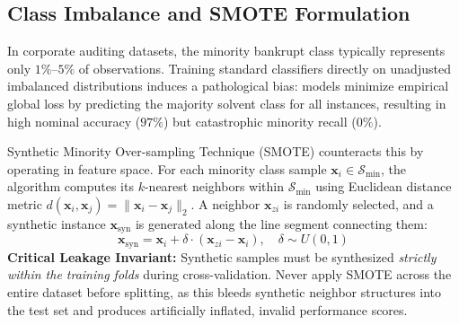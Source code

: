 \documentclass[11pt, a4paper]{article}
\begin{document}
\subsection{Class Imbalance and SMOTE Formulation}
In corporate auditing datasets, the minority bankrupt class typically represents only $1\%\text{--}5\%$ of observations. Training standard classifiers directly on unadjusted imbalanced distributions induces a pathological bias: models minimize empirical global loss by predicting the majority solvent class for all instances, resulting in high nominal accuracy ($97\%$) but catastrophic minority recall ($0\%$).

Synthetic Minority Over-sampling Technique (SMOTE) counteracts this by operating in feature space. For each minority class sample $\mathbf{x}_i \in \mathcal{S}_{\text{min}}$, the algorithm computes its $k$-nearest neighbors within $\mathcal{S}_{\text{min}}$ using Euclidean distance metric $d(\mathbf{x}_i, \mathbf{x}_j) = \|\mathbf{x}_i - \mathbf{x}_j\|_2$. A neighbor $\mathbf{x}_{zi}$ is randomly selected, and a synthetic instance $\mathbf{x}_{\text{syn}}$ is generated along the line segment connecting them:
\begin{equation}
    \mathbf{x}_{\text{syn}} = \mathbf{x}_i + \delta \cdot (\mathbf{x}_{zi} - \mathbf{x}_i), \quad \delta \sim U(0, 1)
\end{equation}
\textbf{Critical Leakage Invariant:} Synthetic samples must be synthesized \textit{strictly within the training folds} during cross-validation. Never apply SMOTE across the entire dataset before splitting, as this bleeds synthetic neighbor structures into the test set and produces artificially inflated, invalid performance scores.
\end{document}
